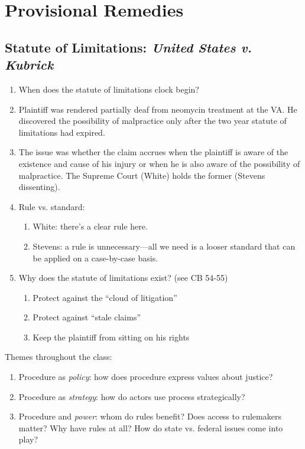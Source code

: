 \section{Provisional Remedies}

\subsection{Statute of Limitations: \emph{United States v. Kubrick}}

\begin{enumerate}
    \item When does the statute of limitations clock begin?
    \item Plaintiff was rendered partially deaf from neomycin treatment at the 
    VA. He discovered the possibility of malpractice only after the two year 
    statute of limitations had expired.
    \item The issue was whether the claim accrues when the plaintiff is aware 
    of the existence and cause of his injury or when he is also aware of the 
    possibility of malpractice. The Supreme Court (White) holds the former 
    (Stevens dissenting).
    \item Rule vs. standard:
    \begin{enumerate}
        \item White: there's a clear rule here.
        \item Stevens: a rule is unnecessary---all we need is a looser 
        standard that can be applied on a case-by-case basis.
    \end{enumerate}
    \item Why does the statute of limitations exist? (see CB 54-55)
    \begin{enumerate}
        \item Protect against the ``cloud of litigation''
        \item Protect against ``stale claims''
        \item Keep the plaintiff from sitting on his rights
    \end{enumerate}
\end{enumerate}

Themes throughout the class:

\begin{enumerate}
    \item Procedure as \emph{policy}: how does procedure express values about 
    justice?
    \item Procedure as \emph{strategy}: how do actors use process 
    strategically?
    \item Procedure and \emph{power}: whom do rules benefit? Does access to 
    rulemakers matter? Why have rules at all? How do state vs. federal issues 
    come into play?
\end{enumerate}

